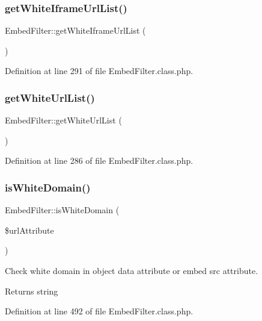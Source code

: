 \subsubsection{\texorpdfstring{get\+White\+Iframe\+Url\+List()}{getWhiteIframeUrlList()}}
{\footnotesize\ttfamily Embed\+Filter\+::get\+White\+Iframe\+Url\+List (\begin{DoxyParamCaption}{ }\end{DoxyParamCaption})}



Definition at line 291 of file Embed\+Filter.\+class.\+php.

\hypertarget{classEmbedFilter_a7e931adc623954f9a372b4ea4976f44f}{}\label{classEmbedFilter_a7e931adc623954f9a372b4ea4976f44f} 
\subsubsection{\texorpdfstring{get\+White\+Url\+List()}{getWhiteUrlList()}}
{\footnotesize\ttfamily Embed\+Filter\+::get\+White\+Url\+List (\begin{DoxyParamCaption}{ }\end{DoxyParamCaption})}



Definition at line 286 of file Embed\+Filter.\+class.\+php.

\hypertarget{classEmbedFilter_a12fcd3bdd961d247598d003b537b5e7f}{}\label{classEmbedFilter_a12fcd3bdd961d247598d003b537b5e7f} 
\subsubsection{\texorpdfstring{is\+White\+Domain()}{isWhiteDomain()}}
{\footnotesize\ttfamily Embed\+Filter\+::is\+White\+Domain (\begin{DoxyParamCaption}\item[{}]{\$url\+Attribute }\end{DoxyParamCaption})}

Check white domain in object data attribute or embed src attribute. \begin{DoxyReturn}{Returns}
string 
\end{DoxyReturn}


Definition at line 492 of file Embed\+Filter.\+class.\+php.

